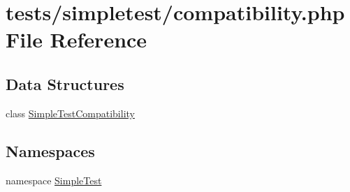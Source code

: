 \hypertarget{compatibility_8php}{\section{tests/simpletest/compatibility.php File Reference}
\label{compatibility_8php}
}
\subsection*{Data Structures}
\begin{DoxyCompactItemize}
\item 
class \hyperlink{class_simple_test_compatibility}{Simple\-Test\-Compatibility}
\end{DoxyCompactItemize}
\subsection*{Namespaces}
\begin{DoxyCompactItemize}
\item 
namespace \hyperlink{namespace_simple_test}{Simple\-Test}
\end{DoxyCompactItemize}
